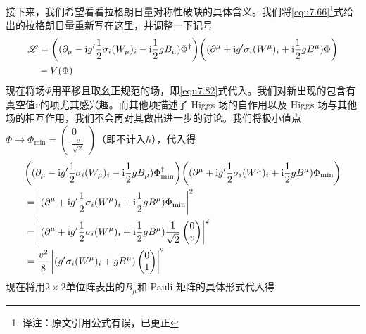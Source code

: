 接下来，我们希望看看拉格朗日量对称性破缺的具体含义。我们将\eqref{equ7.66}\footnote{译注：原文引用公式有误，已更正}式给出的拉格朗日量重新写在这里，并调整一下记号
\begin{equation}
\label{equ7.83}
\begin{aligned}
{\mathscr L} &= \bigg( (\partial_\mu-\mathrm i g'\frac{1}{2}\sigma_i(W_\mu)_i-\mathrm i\frac{1}{2}gB_\mu)\Phi^\dag \bigg) \bigg( (\partial^\mu+\mathrm i g' \sigma_i(W^\mu)_i+\mathrm i\frac{1}{2}gB^\mu)\Phi \bigg)\\
 & -V(\Phi)
\end{aligned}
\end{equation}
现在将场$\Phi$用平移且取幺正规范的场，即\eqref{equ7.82}式代入。我们对新出现的包含有真空值$v$的项尤其感兴趣。而其他项描述了 Higgs 场的自作用以及 Higgs 场与其他场的相互作用，我们不会再对其做出进一步的讨论。我们将极小值点$\Phi\rightarrow\Phi_{\min}= \begin{pmatrix}
0 \\\frac{v}{\sqrt{2}}
\end{pmatrix}$（即不计入$h$），代入得
\[
\begin{aligned}
& \bigg( (\partial_\mu-\mathrm i g'\frac{1}{2}\sigma_i(W_\mu)_i-\mathrm i\frac{1}{2}gB_\mu)\Phi^\dag_{\min} \bigg)  \bigg( (\partial^\mu+\mathrm i g'\frac{1}{2}\sigma_i(W^\mu)_i+\mathrm i\frac{1}{2}gB^\mu)\Phi_{\min} \bigg) \\
& = \left|(\partial^\mu+\mathrm i g'\frac{1}{2}\sigma_i(W^\mu)_i+\mathrm i\frac{1}{2}gB^\mu)\Phi_{\min}\right|^2 \\
& = \left|(\partial^\mu+\mathrm i g'\frac{1}{2}\sigma_i(W^\mu)_i+\mathrm i\frac{1}{2}gB^\mu)\frac{1}{\sqrt{2}}\begin{pmatrix}
0 \\ v
\end{pmatrix}\right|^2 \\
& = \frac{v^2}{8} \left|( g'\sigma_i(W^\mu)_i+gB^\mu)\begin{pmatrix} 0 \\ 1 \end{pmatrix}\right|^2
\end{aligned}
\]
现在将用$2\times 2$单位阵表出的$B_\mu$和 Pauli 矩阵的具体形式代入得
